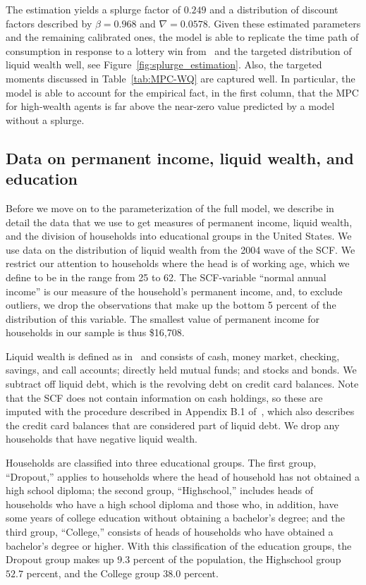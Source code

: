 \documentclass[\latexroot/\projectname]{subfiles}
\begin{document}
The estimation yields a splurge factor of $0.249$ and a distribution of discount factors described by $\beta = 0.968$ and $\nabla=0.0578$.
Given these estimated parameters and the remaining calibrated ones, the model is able to replicate the time path of consumption in response to a lottery win from~\cite{fagereng-mpc-2021} and the targeted distribution of liquid wealth well, see Figure~\ref{fig:splurge_estimation}.
Also, the targeted moments discussed in Table~\ref{tab:MPC-WQ} are captured well.
In particular, the model is able to account for the empirical fact, in the first column, that the MPC for high-wealth agents is far above the near-zero value predicted by a model without a splurge.

\subsection{Data on permanent income, liquid wealth, and education}\whenintegrated{\label{data-on-permanent-income-liquid-wealth-and-education}}
\whenintegrated{\label{sec:SCFdata}}

Before we move on to the parameterization of the full model, we describe in detail the data that we use to get measures of permanent income, liquid wealth, and the division of households into educational groups in the United States.
We use data on the distribution of liquid wealth from the 2004 wave of the SCF.
We restrict our attention to households where the head is of working age, which we define to be in the range from 25 to 62.
The SCF-variable ``normal annual income'' is our measure of the household's permanent income, and, to exclude outliers, we drop the observations that make up the bottom 5 percent of the distribution of this variable.
The smallest value of permanent income for households in our sample is thus \$16,708.

Liquid wealth is defined as in~\cite{kaplan2014model} and consists of cash, money market, checking, savings, and call accounts; directly held mutual funds; and stocks and bonds.
We subtract off liquid debt, which is the revolving debt on credit card balances.
Note that the SCF does not contain information on cash holdings, so these are imputed with the procedure described in Appendix B.1 of~\cite{kaplan2014model}, which also describes the credit card balances that are considered part of liquid debt.
We drop any households that have negative liquid wealth.

Households are classified into three educational groups.
The first group, ``Dropout,'' applies to households where the head of household has not obtained a high school diploma; the second group, ``Highschool,'' includes heads of households who have a high school diploma and those who, in addition, have some years of college education without obtaining a bachelor's degree; and the third group, ``College,'' consists of heads of households who have obtained a bachelor's degree or higher.
With this classification of the education groups, the Dropout group makes up $9.3$ percent of the population, the Highschool group $52.7$ percent, and the College group $38.0$ percent.
\end{document}
